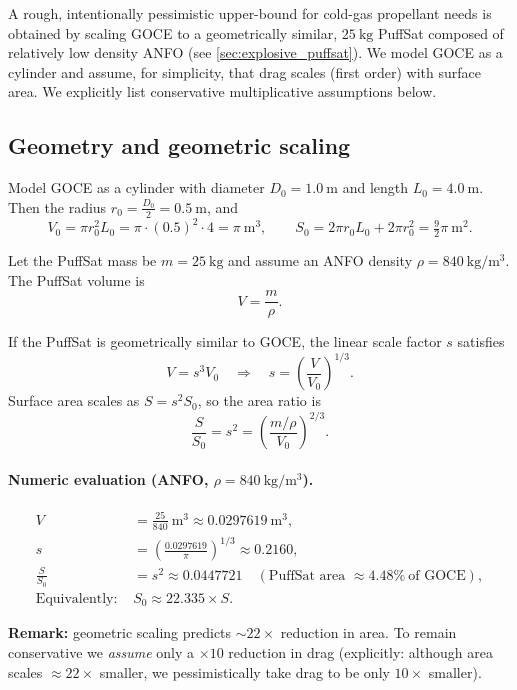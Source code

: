 \documentclass{article}
\begin{document}
A rough, intentionally pessimistic upper-bound for cold-gas propellant needs is obtained by scaling GOCE to a geometrically similar, \(\SI{25}{\kg}\) PuffSat composed of relatively low density ANFO (see \autoref{sec:explosive_puffsat}).  We model GOCE as a cylinder and assume, for simplicity, that drag scales (first order) with surface area.  We explicitly list conservative multiplicative assumptions below.

\subsection*{Geometry and geometric scaling}
Model GOCE as a cylinder with diameter \(D_0=\SI{1.0}{\m}\) and length \(L_0=\SI{4.0}{\meter}\).  Then the radius \(r_0=\tfrac{D_0}{2}=\SI{0.5}{\meter}\), and
\[
V_0 = \pi r_0^2 L_0 = \pi\cdot(0.5)^2\cdot 4 = \pi\ \mathrm{m^3},
\qquad
S_0 = 2\pi r_0 L_0 + 2\pi r_0^2 = \tfrac{9}{2}\pi\ \mathrm{m^2}.
\]

Let the PuffSat mass be \(m=\SI{25}{\kg}\) and assume an ANFO density
\(\rho=\SI{840}{\kg\per\m^3}\).  The PuffSat volume is
\[
V=\frac{m}{\rho}.
\]

If the PuffSat is geometrically similar to GOCE, the linear scale factor \(s\) satisfies
\[
V = s^3 V_0
\quad\Longrightarrow\quad
s = \left(\frac{V}{V_0}\right)^{1/3}.
\]
Surface area scales as \(S = s^2 S_0\), so the area ratio is
\[
\frac{S}{S_0} = s^2 = \left(\frac{m/\rho}{V_0}\right)^{2/3}.
\]

\paragraph{Numeric evaluation (ANFO, \(\rho=\SI{840}{\kg\per\m^3}\)).}
\[
\begin{aligned}
V &= \frac{25}{840}\ \mathrm{m^3} \approx 0.0297619\ \mathrm{m^3},\\[4pt]
s &= \left(\frac{0.0297619}{\pi}\right)^{1/3} \approx 0.2160,\\[4pt]
\frac{S}{S_0} &= s^2 \approx 0.0447721 \quad(\text{PuffSat area } \approx 4.48\%\ \text{of GOCE}),\\[4pt]
\text{Equivalently: } & S_0 \approx 22.335 \times S.
\end{aligned}
\]

\noindent\textbf{Remark:} geometric scaling predicts \(\sim22\times\) reduction in area.  To remain conservative we \emph{assume} only a \(\times 10\) reduction in drag (explicitly: although area scales \(\approx22\times\) smaller, we pessimistically take drag to be only \(10\times\) smaller).
\end{document}
